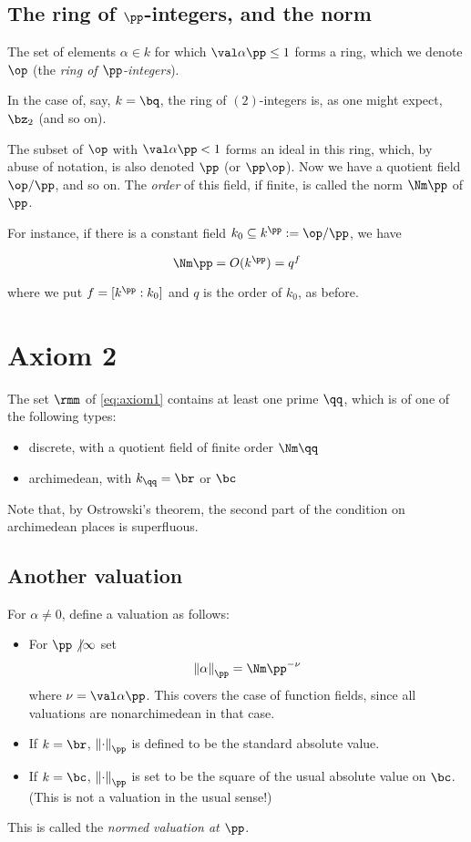 \subsection{The ring of $\pp$-integers, and the norm}
\label{subsec:ring-of-integers}
The set of elements $\alpha\in k$ for which $\val\alpha\pp \leq 1$ forms a
ring, which we denote $\op$ (the \textit{ring of $\pp$-integers}).

\begin{example}
  In the case of, say, $k = \bq$, the ring of $(2)$-integers is, as one might
  expect, $\bz_2$ (and so on).
\end{example}

The subset of $\op$ with $\val\alpha\pp < 1$ forms an ideal in this ring, which,
by abuse of notation, is also denoted $\pp$ (or $\pp\op$). Now we have a
quotient field $\op/\pp$, and so on. The \emph{order} of this field, if finite,
is called the norm $\Nm\pp$ of $\pp$.

For instance, if there is a constant field $k_0 \subseteq k^{\pp} := \op/\pp$, we
have

\[ \Nm\pp = O(k^\pp) = q^f \]

where we put $f = {[k^\pp : k_0]}$ and $q$ is the order of $k_0$, as before.

\section{Axiom 2}
\label{sub:axiom2}
\begin{axiom}
  \label{eq:axiom2}
  The set $\rmm$ of \ref{eq:axiom1} contains at least one prime $\qq$, which is of
  one of the following types:
  \begin{itemize}
  \item discrete, with a quotient field of finite order $\Nm\qq$
  \item archimedean, with $k_\qq=\br$ or $\bc$
  \end{itemize}
\end{axiom}
Note that, by Ostrowski's theorem, the second part of the condition on
archimedean places is superfluous.

\subsection{Another valuation}
\label{sec:orgheadline21}
For $\alpha\neq 0$, define a valuation as follows:
\begin{itemize}
\item For $\pp \not | \infty$ set
  \[ { \left\lVert \alpha \right\rVert }_\pp = { \Nm\pp^{-\nu} } \]
  where $\nu = \val \alpha \pp$. This covers the case of function fields, since
  all valuations are nonarchimedean in that case.
\item If $k=\br$, $\left\lVert \cdot \right\rVert_\pp$ is defined to be the
  standard absolute value.
\item If $k=\bc$, $\left\lVert \cdot \right\rVert_\pp$ is set to be the square
  of the usual absolute value on $\bc$. (This is not a valuation in the usual
  sense!)
\end{itemize}
This is called the \textit{normed valuation at $\pp$}.


